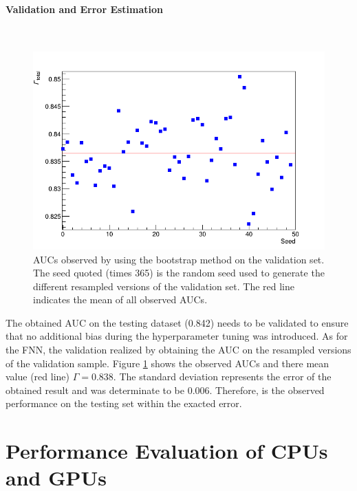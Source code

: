 \paragraph{Validation and Error Estimation} \mbox{} \\

\begin{figure}[H]
\centering
\includegraphics[width=\linewidth]{figs/RNN/BootStrap_RNN}
\caption{AUCs observed by using the bootstrap method on the validation set. The seed quoted (times 365) is the random seed used to generate the different resampled versions of the validation set. The red line indicates the mean of all observed AUCs.}
\label{fig:RNNBootStrap}
\end{figure}

The obtained AUC on the testing dataset (0.842) needs to be validated to 
ensure that no additional bias during the hyperparameter tuning was introduced. As for the FNN, the validation realized by obtaining the AUC on the resampled versions of the validation sample. Figure \ref{fig:RNNBootStrap} shows the observed AUCs and there mean value (red line) $\Gamma = 0.838$. The standard deviation represents the error of the obtained result and was determinate to be 0.006. Therefore, is the observed performance on the testing set within the exacted error.


\newpage

\section{Performance Evaluation of CPUs and GPUs}
\label{sec:CPUGPU}

